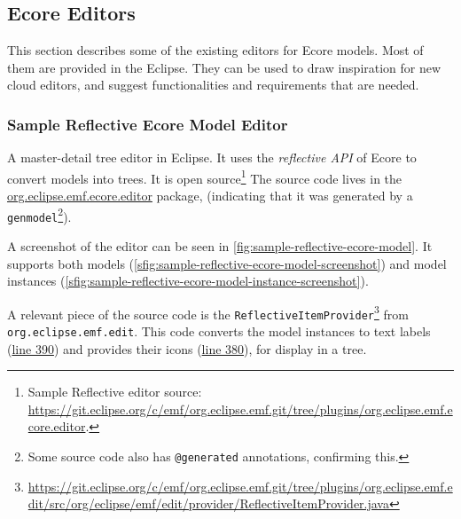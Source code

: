 \subsection{Ecore Editors}\label{sec:ecore-editors}

This section describes some of the existing editors for \gls{Ecore} models.
Most of them are provided in the \gls{Eclipse}.
They can be used to draw inspiration for new \gls{cloud} editors, and suggest functionalities and requirements that are needed.

\subsubsection{Sample Reflective Ecore Model Editor} %
A master-detail tree editor in \gls{Eclipse}.
It uses the \emph{reflective \acrshort{API}} of \gls{Ecore} to convert models into trees.
It is \gls{open source}\footnote{Sample Reflective editor source: \href{https://git.eclipse.org/c/emf/org.eclipse.emf.git/tree/plugins/org.eclipse.emf.ecore.editor}{https://git.eclipse.org/c/emf/org.eclipse.emf.git/tree/plugins/org.eclipse.emf.ecore.editor}.}
The source code lives in the \href{https://git.eclipse.org/c/emf/org.eclipse.emf.git/tree/plugins/org.eclipse.emf.ecore.editor/src/org/eclipse/emf/ecore/presentation/EcoreEditor.java}{org.eclipse.emf.ecore.editor} package, (indicating that it was generated by a \texttt{genmodel}\footnote{Some source code also has \texttt{@generated} annotations, confirming this.}).

A screenshot of the editor can be seen in \cref{fig:sample-reflective-ecore-model}.
It supports both models (\cref{sfig:sample-reflective-ecore-model-screenshot}) and model instances (\cref{sfig:sample-reflective-ecore-model-instance-screenshot}).

A relevant piece of the source code is the \texttt{ReflectiveItemProvider}\footnote{\href{https://git.eclipse.org/c/emf/org.eclipse.emf.git/tree/plugins/org.eclipse.emf.edit/src/org/eclipse/emf/edit/provider/ReflectiveItemProvider.java}{https://git.eclipse.org/c/emf/org.eclipse.emf.git/tree/plugins/org.eclipse.emf.edit/src/org/eclipse/emf/edit/provider/ReflectiveItemProvider.java}} from \texttt{org.eclipse.emf.edit}.
This code converts the model instances to text labels (\href{https://git.eclipse.org/c/emf/org.eclipse.emf.git/tree/plugins/org.eclipse.emf.edit/src/org/eclipse/emf/edit/provider/ReflectiveItemProvider.java#n390}{line 390}) and provides their icons (\href{https://git.eclipse.org/c/emf/org.eclipse.emf.git/tree/plugins/org.eclipse.emf.edit/src/org/eclipse/emf/edit/provider/ReflectiveItemProvider.java#n380}{line 380}), for display in a tree.

